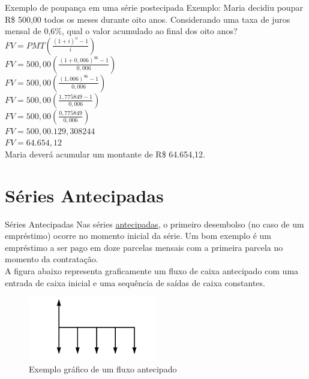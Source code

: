\documentclass[10pt]{beamer}
\begin{document}
\begin{frame}{Exemplo de poupança em uma série postecipada}
\footnotesize  Exemplo: Maria decidiu poupar R\$ 500,00 todos os meses durante oito anos. Considerando uma taxa de juros mensal de 0,6\%, qual o valor acumulado ao final dos oito anos?\\
$ FV = PMT \left( \frac{ ( 1 + i ) ^{n} - 1 }{ i } \right) $\\
$ FV = 500,00 \left( \frac{ ( 1 + 0,006 ) ^{96} - 1 }{ 0,006 } \right) $\\
$ FV = 500,00 \left( \frac{ ( 1,006 ) ^{96} - 1 }{ 0,006 } \right) $\\
$ FV = 500,00 \left( \frac{ 1,775849 - 1 }{ 0,006 } \right) $\\
$ FV = 500,00 \left( \frac{ 0,775849 }{ 0,006 } \right) $\\
$ FV = 500,00 . 129,308244 $\\
$ FV = 64.654,12$\\
Maria deverá acumular um montante de R\$ 64.654,12.
\end{frame}




\section{Séries Antecipadas}


\begin{frame}[fragile]{Séries Antecipadas}
Nas séries \underline{antecipadas}, o primeiro desembolso (no caso de um empréstimo) ocorre no momento inicial da série. Um bom exemplo é um empréstimo a ser pago em doze parcelas mensais com a primeira parcela no momento da contratação.\\
A figura abaixo representa graficamente um fluxo de caixa antecipado com uma entrada de caixa inicial e uma sequência de saídas de caixa constantes.
\begin{figure}
  \begin{center}
    \includegraphics[width=0.5\textwidth]{Fluxoantecipado.jpg}
    \caption{Exemplo gráfico de um fluxo antecipado}
    \label{fig:Fluxoantecipado}
  \end{center}
\end{figure}
\end{frame}
\end{document}
